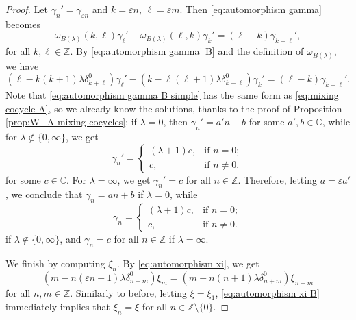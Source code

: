 \documentclass[10pt,a4paper]{amsart}
\newcommand{\CC}{\mathbb{C}}
\newcommand{\ZZ}{\mathbb{Z}}
\newcommand{\nonzero}{\setminus \{0\}}
\begin{document}
\begin{proof}
    Let $\gamma_n' = \gamma_{\varepsilon n}$ and $k = \varepsilon n$, $\ell = \varepsilon m$. Then \eqref{eq:automorphism gamma} becomes
    \begin{equation}\label{eq:automorphism gamma' B}
        \omega_{B(\lambda)}(k,\ell)\gamma_\ell' - \omega_{B(\lambda)}(\ell,k)\gamma_k' = (\ell - k)\gamma_{k+\ell}',
    \end{equation}
    for all $k,\ell \in \ZZ$. By \eqref{eq:automorphism gamma' B} and the definition of $\omega_{B(\lambda)}$, we have
    \begin{equation}\label{eq:automorphism gamma B simple}
        (\ell - k(k + 1)\lambda \delta_{k+\ell}^0)\gamma_\ell' - (k - \ell(\ell + 1)\lambda \delta_{k+\ell}^0)\gamma_k' = (\ell - k)\gamma_{k+\ell}'.
    \end{equation}
    Note that \eqref{eq:automorphism gamma B simple} has the same form as \eqref{eq:mixing cocycle A}, so we already know the solutions, thanks to the proof of Proposition \ref{prop:W_A mixing cocycles}: if $\lambda = 0$, then $\gamma_n' = a'n + b$ for some $a',b \in \CC$, while for $\lambda \notin \{0,\infty\}$, we get
    $$\gamma_n' = \begin{cases}
        (\lambda + 1)c, &\text{if } n = 0; \\
        c, &\text{if } n \neq 0.
    \end{cases}$$
    for some $c \in \CC$. For $\lambda = \infty$, we get $\gamma_n' = c$ for all $n \in \ZZ$. Therefore, letting $a = \varepsilon a'$, we conclude that $\gamma_n = an + b$ if $\lambda = 0$, while
    $$\gamma_n = \begin{cases}
        (\lambda + 1)c, &\text{if } n = 0; \\
        c, &\text{if } n \neq 0.
    \end{cases}$$
    if $\lambda \notin \{0,\infty\}$, and $\gamma_n = c$ for all $n \in \ZZ$ if $\lambda = \infty$.

    We finish by computing $\xi_n$. By \eqref{eq:automorphism xi}, we get
    \begin{equation}\label{eq:automorphism xi B}
        (m - n(\varepsilon n + 1)\lambda \delta_{n+m}^0)\xi_m = (m - n(n + 1)\lambda \delta_{n+m}^0)\xi_{n+m}
    \end{equation}
    for all $n,m \in \ZZ$. Similarly to before, letting $\xi = \xi_1$, \eqref{eq:automorphism xi B} immediately implies that $\xi_n = \xi$ for all $n \in \ZZ \nonzero$.
    

\end{proof}
\end{document}
